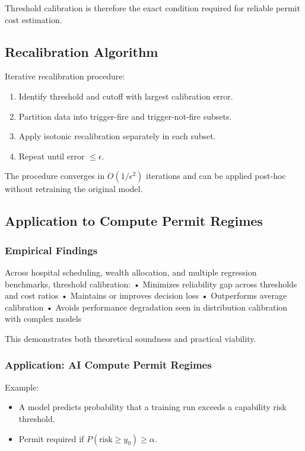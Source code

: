 Threshold calibration is therefore the exact condition required for reliable permit cost estimation.

\subsection{Recalibration Algorithm }
Iterative recalibration procedure:
\begin{enumerate}
    \item  Identify threshold and cutoff with largest calibration error.
    \item Partition data into trigger-fire and trigger-not-fire subsets.
    \item Apply isotonic recalibration separately in each subset.
    \item Repeat until error $\le \epsilon$.
\end{enumerate}

The procedure converges in $O(1/\epsilon^2)$ iterations and can be applied post-hoc without retraining the original model.

\subsection{Application to Compute Permit Regimes}
\subsubsection{ Empirical Findings}
Across hospital scheduling, wealth allocation, and multiple regression benchmarks, threshold calibration:
• Minimizes reliability gap across thresholds and cost ratios  
• Maintains or improves decision loss  
• Outperforms average calibration  
• Avoids performance degradation seen in distribution calibration with complex models  

This demonstrates both theoretical soundness and practical viability.

\subsubsection{Application: AI Compute Permit Regimes}
Example:
\begin{itemize}
    \item  A model predicts probability that a training run exceeds a capability risk threshold.
    \item  Permit required if $P(\text{risk} \ge y_0) \ge \alpha$.
\end{itemize}


